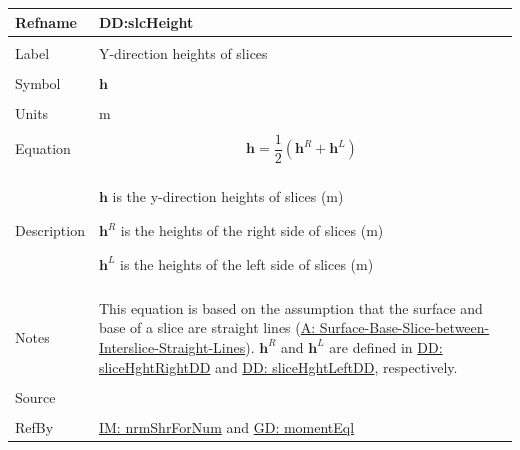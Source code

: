 \documentclass[12pt]{article}
\begin{document}
\noindent \begin{minipage}{\textwidth}
          \begin{tabular}{>{\raggedright}p{}>{\raggedright\arraybackslash}p{}}
          \toprule \textbf{Refname} & \textbf{DD:slcHeight}
          \label{DD:slcHeight}
          \\ \midrule \\
          Label & Y-direction heights of slices
          \\ \midrule \\
          Symbol & $\mathbf{h}$
          \\ \midrule \\
          Units & m
          \\ \midrule \\
          Equation & \begin{displaymath}
                     \mathbf{h}=\frac{1}{2} \left({\mathbf{h}^{R}}+{\mathbf{h}^{L}}\right)
                     \end{displaymath}
          \\ \midrule \\
          Description & \begin{symbDescription}
                        \item{$\mathbf{h}$ is the y-direction heights of slices (m)}
                        \item{${\mathbf{h}^{R}}$ is the heights of the right side of slices (m)}
                        \item{${\mathbf{h}^{L}}$ is the heights of the left side of slices (m)}
                        \end{symbDescription}
          \\ \midrule \\
          Notes & This equation is based on the assumption that the surface and base of a slice are straight lines (\hyperref[assumpSBSBISL]{A: Surface-Base-Slice-between-Interslice-Straight-Lines}).
                  ${\mathbf{h}^{R}}$ and ${\mathbf{h}^{L}}$ are defined in \hyperref[DD:sliceHghtRightDD]{DD: sliceHghtRightDD} and \hyperref[DD:sliceHghtLeftDD]{DD: sliceHghtLeftDD}, respectively.
          \\ \midrule \\
          Source & \cite{fredlund1977}
          \\ \midrule \\
          RefBy & \hyperref[IM:nrmShrForNum]{IM: nrmShrForNum} and \hyperref[GD:momentEql]{GD: momentEql}
          \\ \bottomrule
          \end{tabular}
          \end{minipage}
\par~
\end{document}
